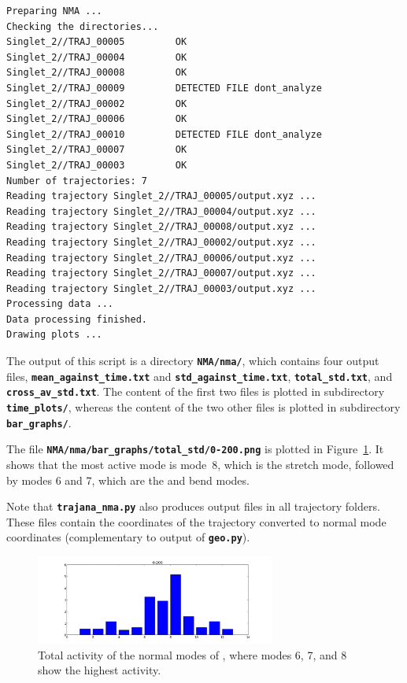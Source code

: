 \documentclass[a4paper,11pt,DIV=15,openany]{scrbook}
\newcommand{\ttt}[1]{\textbf{\texttt{#1}}}
\begin{document}
\begin{oframed}
\begin{Verbatim}[commandchars=\\\{\}]
Preparing NMA ...
Checking the directories...
Singlet_2//TRAJ_00005         OK
Singlet_2//TRAJ_00004         OK
Singlet_2//TRAJ_00008         OK
Singlet_2//TRAJ_00009         DETECTED FILE dont_analyze
Singlet_2//TRAJ_00002         OK
Singlet_2//TRAJ_00006         OK
Singlet_2//TRAJ_00010         DETECTED FILE dont_analyze
Singlet_2//TRAJ_00007         OK
Singlet_2//TRAJ_00003         OK
Number of trajectories: 7
Reading trajectory Singlet_2//TRAJ_00005/output.xyz ...
Reading trajectory Singlet_2//TRAJ_00004/output.xyz ...
Reading trajectory Singlet_2//TRAJ_00008/output.xyz ...
Reading trajectory Singlet_2//TRAJ_00002/output.xyz ...
Reading trajectory Singlet_2//TRAJ_00006/output.xyz ...
Reading trajectory Singlet_2//TRAJ_00007/output.xyz ...
Reading trajectory Singlet_2//TRAJ_00003/output.xyz ...
Processing data ...
Data processing finished.
Drawing plots ...
\end{Verbatim}
\end{oframed}

\normalsize
The output of this script is a directory \ttt{NMA/nma/}, which contains four output files, \ttt{mean\_against\_time.txt} and \ttt{std\_against\_time.txt}, \ttt{total\_std.txt}, and \ttt{cross\_av\_std.txt}.
The content of the first two files is plotted in subdirectory \ttt{time\_plots/}, whereas the content of the two other files is plotted in subdirectory \ttt{bar\_graphs/}.

The file  \ttt{NMA/nma/bar\_graphs/total\_std/0-200.png} is plotted in Figure~\ref{fig:nma}.
It shows that the most active mode is mode~8, which is the  stretch mode, followed by modes 6 and 7, which are the  and  bend modes.

Note that \ttt{trajana\_nma.py} also produces output files in all trajectory folders.
These files contain the coordinates of the trajectory converted to normal mode coordinates (complementary to output of \ttt{geo.py}).

\begin{figure}[ptb]
  \centering
  \includegraphics[width=0.7\textwidth]{figures/nma.png}
  \caption{Total activity of the normal modes of , where modes 6, 7, and 8 show the highest activity.}
  \label{fig:nma}
\end{figure}
\end{document}

